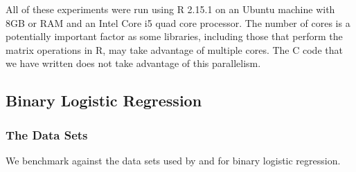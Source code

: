 \documentclass{article}
\begin{document}
All of these experiments were run using R 2.15.1 on an Ubuntu machine with 8GB
or RAM and an Intel Core i5 quad core processor.  The number of cores is a
potentially important factor as some libraries, including those that perform the
matrix operations in R, may take advantage of multiple cores.  The C code that
we have written does not take advantage of this parallelism.

\subsection{Binary Logistic Regression}

\subsubsection{The Data Sets}

We benchmark against the data sets used by \cite{holmes-held-2006} and
\cite{fruhwirth-schnatter-fruhwirth-2010} for binary logistic regression.
\end{document}
